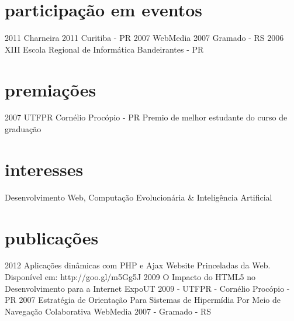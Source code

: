 \documentclass[]{friggeri-cv}
\begin{document}
	


	\section{participação em eventos}

	\begin{entrylist}
		\entry
		{2011}
		{Charneira 2011}
		{}
		{Curitiba - PR}
		\entry
		{2007}
		{WebMedia 2007}
		{}
		{Gramado - RS}
		\entry
		{2006}
		{XIII Escola Regional de Informática}
		{}
		{Bandeirantes - PR}
	\end{entrylist}

	

	\section{premiações}

	\begin{entrylist}
		\entry
		{2007}
		{UTFPR}
		{Cornélio Procópio - PR}
		{Premio de melhor estudante do curso de graduação}
	\end{entrylist}

	\section{interesses}

	Desenvolvimento Web, Computação Evolucionária  \& Inteligência Artificial

	\section{publicações}

	\begin{entrylist}
		\entry
		{2012}
		{Aplicações dinâmicas com PHP e Ajax}
		{}
		{Website Princeladas da Web. \\ Disponível em: http://goo.gl/m5Gg5J}
		\entry
		{2009}
		{O Impacto do HTML5 no Desenvolvimento para a Internet}
		{}
		{ExpoUT 2009 - UTFPR - Cornélio Procópio - PR}
		\entry
		{2007}
		{Estratégia de Orientação Para Sistemas de Hipermídia Por Meio de Navegação Colaborativa}
		{}
		{WebMedia 2007 - Gramado - RS}
	\end{entrylist}
\end{document}
